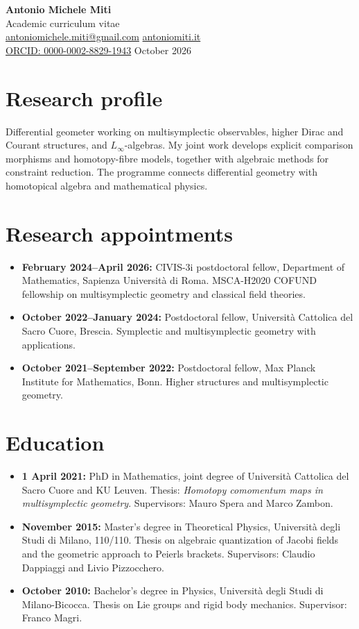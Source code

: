 \documentclass[11pt,a4paper]{article}
\newcommand{\AI}[1]{{\color{AIReviewRed}#1}}
\begin{document}
\begin{center}
{\LARGE\bfseries Antonio Michele Miti}\\[0.2em]
{\large Academic curriculum vitae}\\[0.3em]
\href{mailto:antoniomichele.miti@gmail.com}{antoniomichele.miti@gmail.com}\quad
\href{https://www.antoniomiti.it/}{antoniomiti.it}\\
\href{https://orcid.org/0000-0002-8829-1943}{ORCID: 0000-0002-8829-1943} October 2026
\end{center}
\section*{Research profile}
\AI{Differential geometer working on multisymplectic observables, higher Dirac and Courant structures, and $L_\infty$-algebras. My joint work develops explicit comparison morphisms and homotopy-fibre models, together with algebraic methods for constraint reduction. The programme connects differential geometry with homotopical algebra and mathematical physics.}
\section*{Research appointments}
\begin{itemize}
\item \textbf{February 2024--April 2026:} CIVIS-3i postdoctoral fellow, Department of Mathematics, Sapienza Universit\`a di Roma. MSCA-H2020 COFUND fellowship on multisymplectic geometry and classical field theories.
\item \textbf{October 2022--January 2024:} Postdoctoral fellow, Universit\`a Cattolica del Sacro Cuore, Brescia. Symplectic and multisymplectic geometry with applications.
\item \textbf{October 2021--September 2022:} Postdoctoral fellow, Max Planck Institute for Mathematics, Bonn. Higher structures and multisymplectic geometry.
\end{itemize}
\section*{Education}
\begin{itemize}
\item \textbf{1 April 2021:} PhD in Mathematics, joint degree of Universit\`a Cattolica del Sacro Cuore and KU Leuven. Thesis: \emph{Homotopy comomentum maps in multisymplectic geometry}. Supervisors: Mauro Spera and Marco Zambon.
\item \textbf{November 2015:} Master's degree in Theoretical Physics, Universit\`a degli Studi di Milano, 110/110. Thesis on algebraic quantization of Jacobi fields and the geometric approach to Peierls brackets. Supervisors: Claudio Dappiaggi and Livio Pizzocchero.
\item \textbf{October 2010:} Bachelor's degree in Physics, Universit\`a degli Studi di Milano-Bicocca. Thesis on Lie groups and rigid body mechanics. Supervisor: Franco Magri.
\end{itemize}
\end{document}
